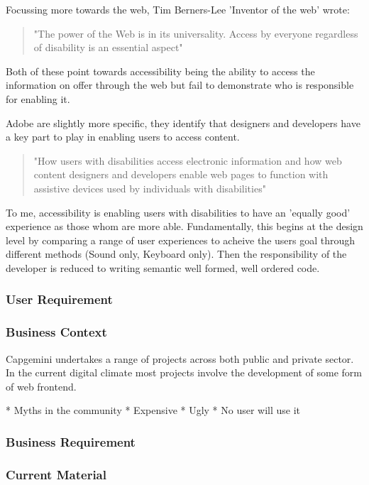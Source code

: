 Focussing more towards the web, Tim Berners-Lee 'Inventor of the web' wrote:
\begin{quote}
"The power of the Web is in its universality. Access by everyone regardless
of disability is an essential aspect"
\end{quote}

Both of these point towards accessibility being the ability to access the
information on offer through the web but fail to demonstrate who is
responsible for enabling it.

Adobe are slightly more specific, they identify that designers and developers
 have a key part to play in enabling users to access content.

\begin{quote}
"How users with disabilities access electronic information and how web content
designers and developers enable web pages to function with assistive devices
used by individuals with disabilities"
\end{quote}

To me, accessibility is enabling users with disabilities to have an 'equally good'
experience as those whom are more able. Fundamentally, this begins at the
design level by comparing a range of user experiences to acheive the users
goal through different methods (Sound only, Keyboard only). Then the
responsibility of the developer is reduced to writing semantic well formed,
well ordered code.


\subsubsection{User Requirement}
\subsubsection{Business Context}
Capgemini undertakes a range of projects across both public and private
sector. In the current digital climate most projects involve the
development of some form of web frontend.


* Myths in the community
  * Expensive
  * Ugly
  * No user will use it
\subsubsection{Business Requirement}
\subsubsection{Current Material}


